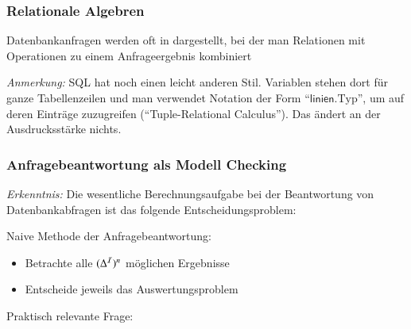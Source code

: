\documentclass[onlymath]{beamer}
\begin{document}
\begin{frame}\frametitle{Relationale Algebren}

Datenbankanfragen werden oft in  dargestellt,
bei der man Relationen mit Operationen zu einem Anfrageergebnis kombiniert
\bigskip


\footnotesize
\emph{Anmerkung:} SQL hat noch einen leicht anderen Stil. Variablen stehen dort für ganze Tabellenzeilen und man verwendet Notation der Form "`$\textsf{linien}.\text{Typ}$"', um auf deren Einträge zuzugreifen ("`Tuple-Relational Calculus"'). Das ändert an der Ausdrucksstärke nichts.

\end{frame}

\begin{frame}\frametitle{Anfragebeantwortung als Modell Checking}

\emph{Erkenntnis:} Die wesentliche Berechnungsaufgabe bei der Beantwortung von Datenbankabfragen ist das folgende Entscheidungsproblem:\bigskip

\bigskip\pause

Naive Methode der Anfragebeantwortung:
\begin{itemize}
\item Betrachte alle $(\Delta^{\mathcal{I}})^n$ möglichen Ergebnisse
\item Entscheide jeweils das Auswertungsproblem
\end{itemize}

Praktisch relevante Frage:\medskip


\end{frame}
\end{document}
